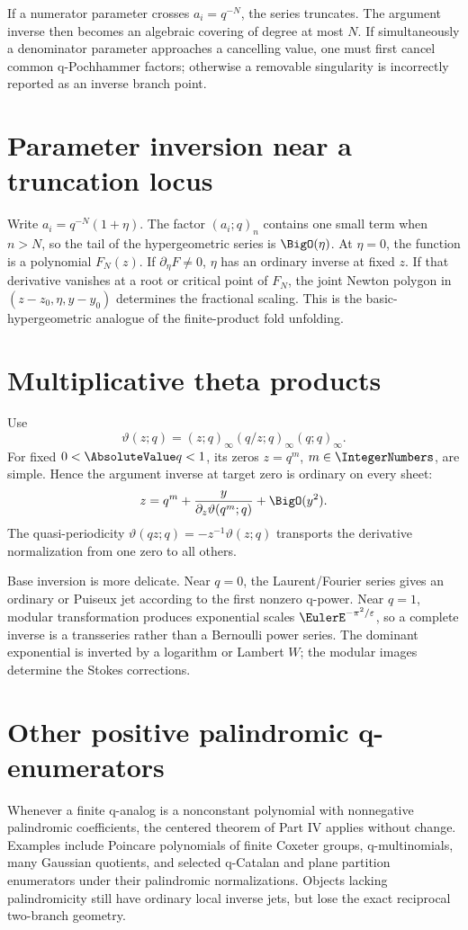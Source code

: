 \documentclass[11pt,letterpaper,oneside,openany]{book}
\theoremstyle{definition}
\theoremstyle{remark}
\begin{document}
If a numerator parameter crosses \(a_i=q^{-N}\), the series truncates.  The
argument inverse then becomes an algebraic covering of degree at most
\(N\).  If simultaneously a denominator parameter approaches a cancelling
value, one must first cancel common q-Pochhammer factors; otherwise a removable
singularity is incorrectly reported as an inverse branch point.

\section{Parameter inversion near a truncation locus}
Write \(a_i=q^{-N}(1+\eta)\).  The factor \((a_i;q)_n\) contains one small term
when \(n>N\), so the tail of the hypergeometric series is \(\BigO(\eta)\).
At \(\eta=0\), the function is a polynomial \(F_N(z)\).  If
\(\partial_\eta F\ne0\), \(\eta\) has an ordinary inverse at fixed \(z\).  If
that derivative vanishes at a root or critical point of \(F_N\), the joint
Newton polygon in \((z-z_0,\eta,y-y_0)\) determines the fractional scaling.
This is the basic-hypergeometric analogue of the finite-product fold
unfolding.

\section{Multiplicative theta products}
Use
\begin{equation}
 \vartheta(z;q)=(z;q)_\infty(q/z;q)_\infty(q;q)_\infty.
 \label{eq:multiplicative-theta}
\end{equation}
For fixed \(0<\AbsoluteValue q<1\), its zeros \(z=q^m\), \(m\in\IntegerNumbers\), are simple.  Hence
the argument inverse at target zero is ordinary on every sheet:
\[
 z=q^m+\frac{y}{\partial_z\vartheta(q^m;q)}+\BigO(y^2).
\]
The quasi-periodicity
\(
 \vartheta(qz;q)=-z^{-1}\vartheta(z;q)
\)
transports the derivative normalization from one zero to all others.

Base inversion is more delicate.  Near \(q=0\), the Laurent/Fourier series gives
an ordinary or Puiseux jet according to the first nonzero q-power.  Near
\(q=1\), modular transformation produces exponential scales
\(\EulerE^{-\pi^2/\varepsilon}\), so a complete inverse is a transseries rather than
a Bernoulli power series.  The dominant exponential is inverted by a logarithm
or Lambert \(W\); the modular images determine the Stokes corrections.

\section{Other positive palindromic q-enumerators}
Whenever a finite q-analog is a nonconstant polynomial with nonnegative
palindromic coefficients, the centered theorem of Part IV applies without
change.  Examples include Poincare polynomials of finite Coxeter groups,
q-multinomials, many Gaussian quotients, and selected q-Catalan and plane
partition enumerators under their palindromic normalizations.  Objects lacking
palindromicity still have ordinary local inverse jets, but lose the exact
reciprocal two-branch geometry.
\end{document}
